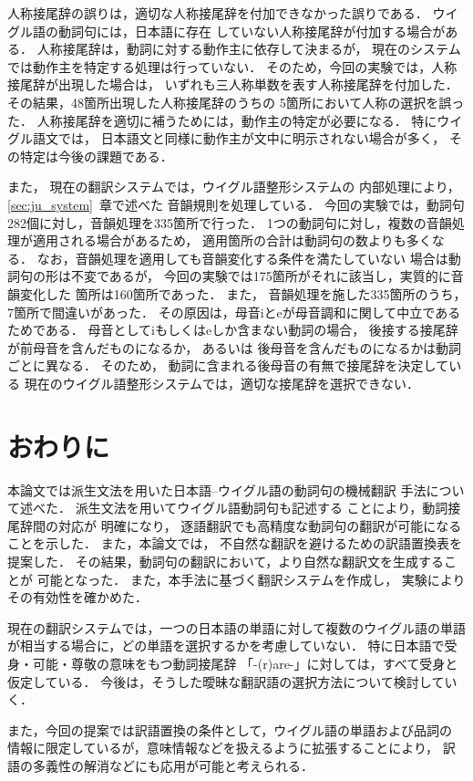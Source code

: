 人称接尾辞の誤りは，適切な人称接尾辞を付加できなかった誤りである．
ウイグル語の動詞句には，日本語に存在
していない人称接尾辞が付加する場合がある．
人称接尾辞は，動詞に対する動作主に依存して決まるが，
現在のシステムでは動作主を特定する処理は行っていない．
そのため，今回の実験では，人称接尾辞が出現した場合は，
いずれも三人称単数を表す人称接尾辞を付加した．
その結果，48箇所出現した人称接尾辞のうちの
5箇所において人称の選択を誤った．
人称接尾辞を適切に補うためには，動作主の特定が必要になる．
特にウイグル語文では，
日本語文と同様に動作主が文中に明示されない場合が多く，
その特定は今後の課題である．

また，
現在の翻訳システムでは，ウイグル語整形システムの
内部処理により，\ref{sec:ju_system}~章で述べた
音韻規則を処理している．
今回の実験では，動詞句282個に対し，音韻処理を335箇所で行った．
1つの動詞句に対し，複数の音韻処理が適用される場合があるため，
適用箇所の合計は動詞句の数よりも多くなる．
なお，音韻処理を適用しても音韻変化する条件を満たしていない
場合は動詞句の形は不変であるが，
今回の実験では175箇所がそれに該当し，実質的に音韻変化した
箇所は160箇所であった．
また，
音韻処理を施した335箇所のうち，
7箇所で間違いがあった．
その原因は，母音iとeが母音調和に関して中立であるためである．
母音としてiもしくはeしか含まない動詞の場合，
後接する接尾辞が前母音を含んだものになるか，
あるいは
後母音を含んだものになるかは動詞ごとに異なる．
そのため，
動詞に含まれる後母音の有無で接尾辞を決定している
現在のウイグル語整形システムでは，適切な接尾辞を選択できない．

\section{おわりに}
本論文では派生文法を用いた日本語--ウイグル語の動詞句の機械翻訳
手法について述べた．
派生文法を用いてウイグル語動詞句も記述する
ことにより，動詞接尾辞間の対応が
明確になり，
逐語翻訳でも高精度な動詞句の翻訳が可能になることを示した．
また，本論文では，
不自然な翻訳を避けるための訳語置換表を提案した．
その結果，動詞句の翻訳において，より自然な翻訳文を生成することが
可能となった．
また，本手法に基づく翻訳システムを作成し，
実験によりその有効性を確かめた．

現在の翻訳システムでは，一つの日本語の単語に対して複数のウイグル語の単語
が相当する場合に，どの単語を選択するかを考慮していない．
特に日本語で受身・可能・尊敬の意味をもつ動詞接尾辞
「-(r)are-」に対しては，すべて受身と仮定している．
今後は，そうした曖昧な翻訳語の選択方法について検討していく．
	
また，今回の提案では訳語置換の条件として，ウイグル語の単語および品詞の
情報に限定しているが，意味情報などを扱えるように拡張することにより，
訳語の多義性の解消などにも応用が可能と考えられる．

